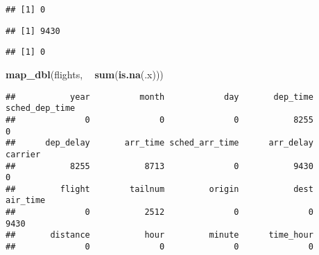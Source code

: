 \documentclass[]{article}
\newenvironment{Shaded}{\begin{snugshade}}{\end{snugshade}}
\newcommand{\KeywordTok}[1]{\textcolor[rgb]{0.13,0.29,0.53}{\textbf{#1}}}
\newcommand{\StringTok}[1]{\textcolor[rgb]{0.31,0.60,0.02}{#1}}
\newcommand{\CommentTok}[1]{\textcolor[rgb]{0.56,0.35,0.01}{\textit{#1}}}
\newcommand{\OperatorTok}[1]{\textcolor[rgb]{0.81,0.36,0.00}{\textbf{#1}}}
\newcommand{\NormalTok}[1]{#1}
\begin{document}
\begin{verbatim}
## [1] 0
\end{verbatim}

\begin{Shaded}
\end{Shaded}

\begin{verbatim}
## [1] 9430
\end{verbatim}

\begin{Shaded}
\end{Shaded}

\begin{verbatim}
## [1] 0
\end{verbatim}

\begin{Shaded}
\begin{Highlighting}[]
\KeywordTok{map_dbl}\NormalTok{(flights, }\OperatorTok{~}\StringTok{ }\KeywordTok{sum}\NormalTok{(}\KeywordTok{is.na}\NormalTok{(.x)))}
\end{Highlighting}
\end{Shaded}

\begin{verbatim}
##           year          month            day       dep_time sched_dep_time 
##              0              0              0           8255              0 
##      dep_delay       arr_time sched_arr_time      arr_delay        carrier 
##           8255           8713              0           9430              0 
##         flight        tailnum         origin           dest       air_time 
##              0           2512              0              0           9430 
##       distance           hour         minute      time_hour 
##              0              0              0              0
\end{verbatim}

\begin{Shaded}
\end{Shaded}
\end{document}
